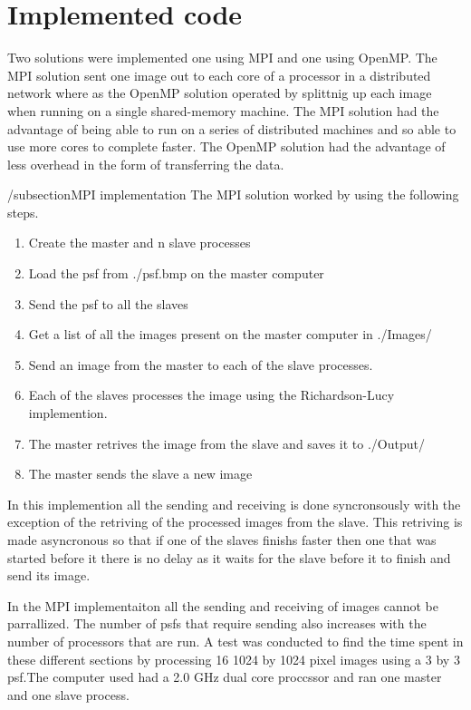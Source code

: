 \section{Implemented code}

Two solutions were implemented one using MPI and one using OpenMP. The MPI solution sent one image out to each core of a processor in a distributed network where as the OpenMP solution operated by splittnig up each image when running on a single shared-memory machine. The MPI solution had the advantage of being able to run on a series of distributed machines and so able to use more cores to complete faster. The OpenMP solution had the advantage of less overhead in the form of transferring the data.

/subsection{MPI implementation}
The MPI solution worked by using the following steps.

\begin{enumerate}
	\item Create the master and n slave processes
	\item Load the psf from ./psf.bmp on the master computer
	\item Send the psf to all the slaves
	\item Get a list of all the images present on the master computer in ./Images/
	\item Send an image from the master to each of the slave processes.
	\item Each of the slaves processes the image using the Richardson-Lucy implemention.
	\item The master retrives the image from the slave and saves it to ./Output/
	\item The master sends the slave a new image
\end{enumerate}

In this implemention all the sending and receiving is done syncronsously with the exception of the retriving of the processed images from the slave. This retriving is made asyncronous so that if one of the slaves finishs faster then one that was started before it there is no delay as it waits for the slave before it to finish and send its image.

In the MPI implementaiton all the sending and receiving of images cannot be parrallized. The number of psfs that require sending also increases with the number of processors that are run. A test was conducted to find the time spent in these different sections by processing 16 1024 by 1024 pixel images  using a 3 by 3 psf.The computer used had a 2.0 GHz dual core proccssor and ran one master and one slave process.

